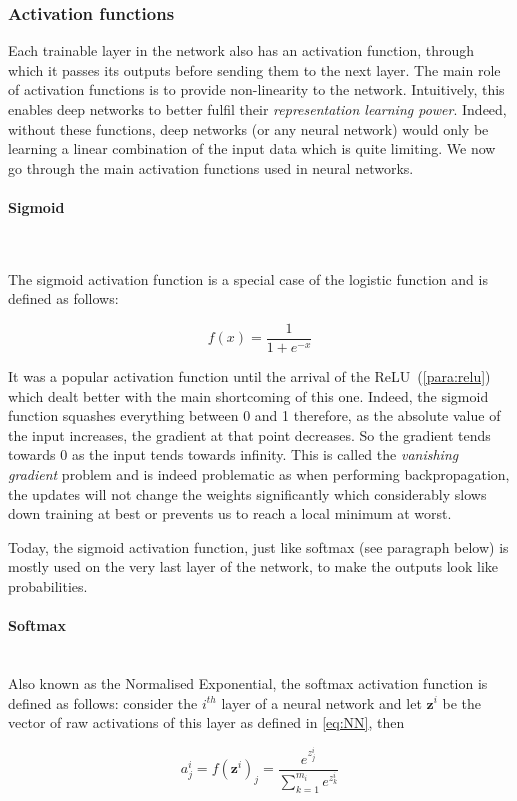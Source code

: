 \documentclass[12pt,twoside]{article}
\newcommand{\para}[1]{\paragraph{#1}\mbox{}\\}
\begin{document}
\subsubsection{Activation functions}\label{sec:activation_functions}

Each trainable layer in the network also has an activation function, through
which it passes its outputs before sending them to the next layer.
The main role of activation functions is to provide non-linearity to the network.
Intuitively, this enables deep networks to better fulfil their \textit{representation
learning power}. Indeed, without these functions, deep networks (or any neural
network) would only be learning a linear combination of the input data which is
quite limiting. We now go through the main activation functions used in neural
networks.

\para{Sigmoid}\label{para:sigmoid}

The sigmoid activation function is a special case of the logistic function and
is defined as follows:

\begin{equation}
  f(x) = \frac{1}{1 + e^{-x}}
  \label{eq:sigmoid}
\end{equation}

It was a popular activation function until the arrival of the
ReLU~(\ref{para:relu}) which dealt better with the main shortcoming of this one.
Indeed, the sigmoid function squashes everything between 0 and 1 therefore, as
the absolute value of the input increases, the gradient at that point
decreases. So the gradient tends towards 0 as the input tends towards infinity.
This is called the \textit{vanishing gradient} problem and is indeed
problematic as when
performing backpropagation, the updates will not change the weights
significantly which considerably slows down training at best or prevents us to reach
a local minimum at worst.

Today, the sigmoid activation function, just like softmax (see paragraph below)
is mostly used on the very last layer of the network, to make the outputs look like
probabilities.

\para{Softmax}\label{para:softmax}
Also known as the Normalised Exponential, the softmax activation function is
defined as follows: consider the $i^{th}$ layer of a neural network and let
$\bm{z}^i$ be the vector of raw activations of this layer as defined in 
\eqref{eq:NN}, then 

\begin{equation}
  a_j^i = f(\bm{z}^i)_j = \frac{e^{z_j^i}}{\sum^{m_{i}}_{k=1} e^{z_k^i}}
  \label{eq:softmax}
\end{equation}
\end{document}
